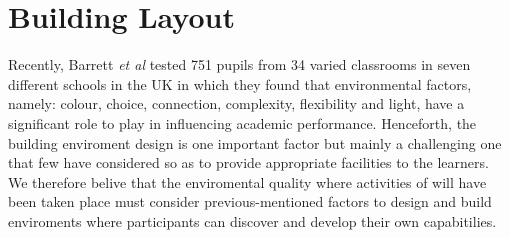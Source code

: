\section{Building Layout}

Recently, Barrett \emph{et al} \cite{Barret2013} tested 751 pupils from 34 
varied classrooms in seven different schools in the UK in which they found 
that environmental factors, namely: colour, choice, connection, complexity, 
flexibility and light, have a significant role to play in influencing academic 
performance. Henceforth, the building enviroment design is one important factor
but mainly a challenging one that few have considered so as to provide 
appropriate facilities to the learners. 
We therefore belive that the enviromental quality where activities
of {\librER} will have been taken place must consider previous-mentioned factors 
to design and build enviroments where participants can discover and develop their
own capabitilies.














